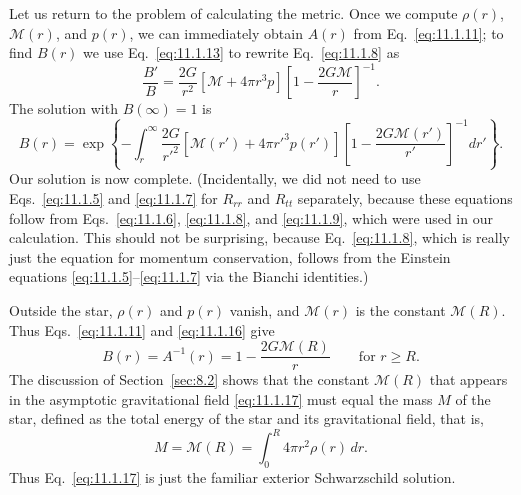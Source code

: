 Let us return to the problem of calculating the metric. Once we compute
\(\rho(r)\), \(\mathcal{M}(r)\), and \(p(r)\), we can immediately obtain
\(A(r)\) from Eq.~\eqref{eq:11.1.11}; to find \(B(r)\) we use
Eq.~\eqref{eq:11.1.13} to rewrite Eq.~\eqref{eq:11.1.8} as
\[
  \frac{B'}B
  =
  \frac{2G}{r^2}\left[\mathcal{M}+4\pi r^3p\right]
  \left[1-\frac{2G\mathcal{M}}r\right]^{-1}.
\]
The solution with \(B(\infty)=1\) is
\begin{equation}
  B(r)
  =
  \exp\left\{
    -\int_r^\infty
    \frac{2G}{r'^2}
    \left[\mathcal{M}(r')+4\pi r'^3p(r')\right]
    \left[1-\frac{2G\mathcal{M}(r')}{r'}\right]^{-1}
    dr'
  \right\}.
  \tag{11.1.16}\label{eq:11.1.16}
\end{equation}
Our solution is now complete. (Incidentally, we did not need to use
Eqs.~\eqref{eq:11.1.5} and \eqref{eq:11.1.7} for \(R_{rr}\) and \(R_{tt}\)
separately, because these equations follow from Eqs.~\eqref{eq:11.1.6},
\eqref{eq:11.1.8}, and \eqref{eq:11.1.9}, which were used in our
calculation. This should not be surprising, because Eq.~\eqref{eq:11.1.8},
which is really just the equation for momentum conservation, follows from the
Einstein equations \eqref{eq:11.1.5}--\eqref{eq:11.1.7} via the Bianchi
identities.)

Outside the star, \(\rho(r)\) and \(p(r)\) vanish, and \(\mathcal{M}(r)\) is
the constant \(\mathcal{M}(R)\). Thus Eqs.~\eqref{eq:11.1.11} and
\eqref{eq:11.1.16} give
\begin{equation}
  B(r)=A^{-1}(r)=1-\frac{2G\mathcal{M}(R)}r
  \qquad\text{for }r\ge R.
  \tag{11.1.17}\label{eq:11.1.17}
\end{equation}
The discussion of Section~\ref{sec:8.2} shows that the constant
\(\mathcal{M}(R)\) that appears in the asymptotic gravitational field
\eqref{eq:11.1.17} must equal the mass \(M\) of the star, defined as the total
energy of the star and its gravitational field, that is,
\begin{equation}
  M=\mathcal{M}(R)=\int_0^R4\pi r^2\rho(r)\,dr.
  \tag{11.1.18}\label{eq:11.1.18}
\end{equation}
Thus Eq.~\eqref{eq:11.1.17} is just the familiar exterior Schwarzschild
solution.

